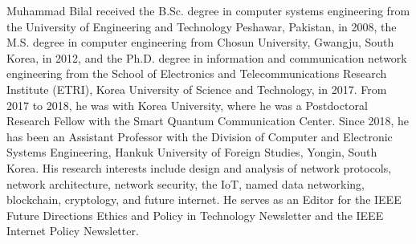 \documentclass[journal,transmag,11pt]{IEEEtran}
\begin{document}
\begin{IEEEbiographynophoto}{Muhammad Bilal}
	received the B.Sc. degree in computer systems engineering from the University of Engineering and Technology Peshawar, Pakistan, in 2008, the M.S. degree in computer engineering from Chosun University, Gwangju, South Korea, in 2012, and the Ph.D. degree in information and communication network engineering from the School of Electronics and Telecommunications Research Institute (ETRI), Korea University of Science and Technology, in 2017. From 2017 to 2018, he was with Korea University, where he was a Postdoctoral Research Fellow with the Smart Quantum Communication Center. Since 2018, he has been an Assistant Professor with the Division of Computer and Electronic Systems Engineering, Hankuk University of Foreign Studies, Yongin, South Korea. His research interests include design and analysis of network protocols, network architecture, network security, the IoT, named data networking, blockchain, cryptology, and future internet. 
	He serves as an Editor for the IEEE Future Directions Ethics and Policy in Technology Newsletter and the IEEE Internet Policy Newsletter.
\end{IEEEbiographynophoto}








\end{document}
